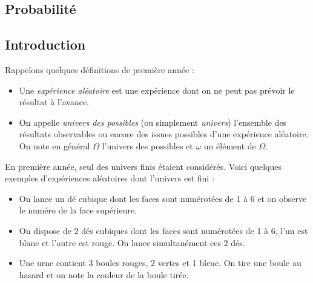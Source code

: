 \documentclass[a4paper,10pt]{report}
\begin{document}
\begin{itemize}
%
%

\section{Probabilité}
\subsection{Introduction}
Rappelons quelques définitions de première année :
\begin{itemize}
 \item Une \emph{expérience aléatoire} est une expérience dont on ne peut pas prévoir le résultat à l'avance. 
 \item On appelle \emph{univers des possibles} (ou simplement \emph{univers}) l'ensemble des résultats observables ou encore des issues possibles d'une expérience aléatoire. On note en général $\Omega$ l'univers des possibles et $\omega$ un élément de $\Omega$.
\end{itemize}
En première année, seul des univers finis étaient considérés. Voici quelques exemples d'expériences aléatoires dont l'univers est fini :

\begin{itemize}
\item On lance un dé cubique dont les faces sont numérotées de 1 à 6 et on observe le numéro de la face supérieure.
\item On dispose de 2 dés cubiques dont les faces sont numérotées de 1 à 6,  l'un est blanc et l'autre est rouge. On lance simultanément ces 2 dés. 
\item Une urne contient 3 boules rouges, 2 vertes et 1 bleue. On tire une boule au hasard et on note la couleur de la boule tirée.
\end{itemize}


\end{itemize}
\end{document}

